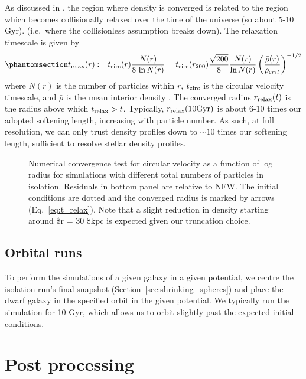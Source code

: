 As discussed in \citet{power+2003}, the region where density is
converged is related to the region which becomes collisionally relaxed
over the time of the universe (so about 5-10 Gyr). (i.e.~where the
collisionless assumption breaks down). The relaxation timescale is given
by \begin{equation}\protect\phantomsection\label{eq:t_relax}{
t_{\rm relax}(r) := t_{\rm circ}(r) \frac{N(r)}{8\,\ln N(r)}
= {t_{\rm circ}(r_{200})} \frac{\sqrt{200}}{8} \frac{N(r)}{\ln N(r)} \left(\frac{\bar \rho (r)}{\rho_{\textrm crit}}\right)^{-1/2}
}\end{equation} where \(N(r)\) is the number of particles within \(r\),
\(t_{\rm circ}\) is the circular velocity timescale, and \(\bar \rho\)
is the mean interior density \citep{power+2003}. The converged radius
\(r_{\rm relax}(t)\) is the radius above which \(t_{\rm relax} > t\).
Typically, \(r_{\rm relax}(10{\rm Gyr})\) is about 6-10 times our adopted
softening length, increasing with particle number. As such, at full
resolution, we can only trust density profiles down to \(\sim10\) times
our softening length, sufficient to resolve stellar density profiles.

\begin{figure}
\centering
{}
\caption[Numerical halo convergence]{Numerical convergence test for
circular velocity as a function of log radius for simulations with
different total numbers of particles in isolation. Residuals in bottom
panel are relative to NFW. The initial conditions are dotted and the
converged radius is marked by arrows (Eq.~\ref{eq:t_relax}). Note that a
slight reduction in density starting around \$r = 30 \$kpc is expected
given our truncation choice.}\label{fig:numerical_convergance}
\end{figure}

\subsection{Orbital runs}\label{orbital-runs}

To perform the simulations of a given galaxy in a given potential, we
centre the isolation run's final snapshot
(Section~\ref{sec:shrinking_spheres}) and place the dwarf galaxy in the
specified orbit in the given potential. We typically run the simulation
for 10 Gyr, which allows us to orbit slightly past the expected initial
conditions.

\section{Post processing}\label{post-processing}

